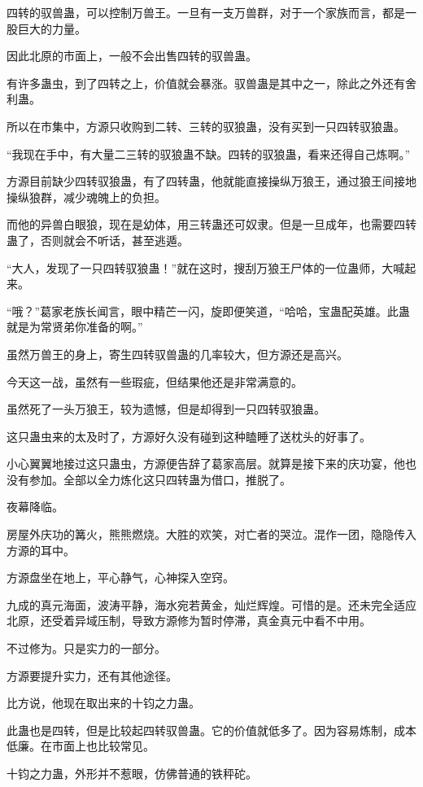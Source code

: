 \begin{this_body}
四转的驭兽蛊，可以控制万兽王。一旦有一支万兽群，对于一个家族而言，都是一股巨大的力量。

因此北原的市面上，一般不会出售四转的驭兽蛊。

有许多蛊虫，到了四转之上，价值就会暴涨。驭兽蛊是其中之一，除此之外还有舍利蛊。

所以在市集中，方源只收购到二转、三转的驭狼蛊，没有买到一只四转驭狼蛊。

“我现在手中，有大量二三转的驭狼蛊不缺。四转的驭狼蛊，看来还得自己炼啊。”

方源目前缺少四转驭狼蛊，有了四转蛊，他就能直接操纵万狼王，通过狼王间接地操纵狼群，减少魂魄上的负担。

而他的异兽白眼狼，现在是幼体，用三转蛊还可奴隶。但是一旦成年，也需要四转蛊了，否则就会不听话，甚至逃遁。

“大人，发现了一只四转驭狼蛊！”就在这时，搜刮万狼王尸体的一位蛊师，大喊起来。

“哦？”葛家老族长闻言，眼中精芒一闪，旋即便笑道，“哈哈，宝蛊配英雄。此蛊就是为常贤弟你准备的啊。”

虽然万兽王的身上，寄生四转驭兽蛊的几率较大，但方源还是高兴。

今天这一战，虽然有一些瑕疵，但结果他还是非常满意的。

虽然死了一头万狼王，较为遗憾，但是却得到一只四转驭狼蛊。

这只蛊虫来的太及时了，方源好久没有碰到这种瞌睡了送枕头的好事了。

小心翼翼地接过这只蛊虫，方源便告辞了葛家高层。就算是接下来的庆功宴，他也没有参加。全部以全力炼化这只四转蛊为借口，推脱了。

夜幕降临。

房屋外庆功的篝火，熊熊燃烧。大胜的欢笑，对亡者的哭泣。混作一团，隐隐传入方源的耳中。

方源盘坐在地上，平心静气，心神探入空窍。

九成的真元海面，波涛平静，海水宛若黄金，灿烂辉煌。可惜的是。还未完全适应北原，还受着异域压制，导致方源修为暂时停滞，真金真元中看不中用。

不过修为。只是实力的一部分。

方源要提升实力，还有其他途径。

比方说，他现在取出来的十钧之力蛊。

此蛊也是四转，但是比较起四转驭兽蛊。它的价值就低多了。因为容易炼制，成本低廉。在市面上也比较常见。

十钧之力蛊，外形并不惹眼，仿佛普通的铁秤砣。


\end{this_body}
